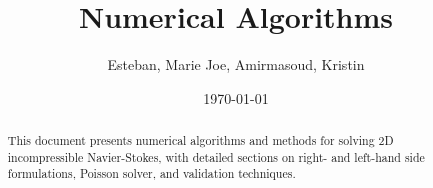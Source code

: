 \documentclass[11pt]{article}
\title{\textbf{Numerical Algorithms}}
\author{Esteban, Marie Joe, Amirmasoud, Kristin}
\date{\today}
\theoremstyle{plain}
\theoremstyle{definition}
\theoremstyle{remark}
\begin{document}
\maketitle
\begin{abstract}
This document presents numerical algorithms and methods for solving 2D incompressible Navier-Stokes, with detailed sections on right- and left-hand side formulations, Poisson solver, and validation techniques.
\end{abstract}











% 
\end{document}
